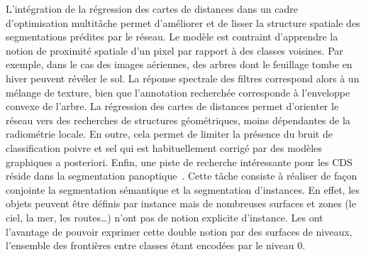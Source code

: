 L'intégration de la régression des cartes de distances dans un cadre d'optimisation multitâche permet d'améliorer et de lisser la structure spatiale des segmentations prédites par le réseau. Le modèle est contraint d'apprendre la notion de proximité spatiale d'un pixel par rapport à des classes voisines. Par exemple, dans le cas des images aériennes, des arbres dont le feuillage tombe en hiver peuvent révéler le sol. La réponse spectrale des filtres correspond alors à un mélange de texture, bien que l'annotation recherchée corresponde à l'enveloppe convexe de l'arbre. La régression des cartes de distances permet d'orienter le réseau vers des recherches de structures géométriques, moins dépendantes de la radiométrie locale. En outre, cela permet de limiter la présence du bruit de classification poivre et sel qui est habituellement corrigé par des modèles graphiques a posteriori.
Enfin, une piste de recherche intéressante pour les \gls{CDS} réside dans la segmentation panoptique~\cite{kirillov_panoptic_2018}. Cette tâche consiste à réaliser de façon conjointe la segmentation sémantique et la segmentation d'instances. En effet, les objets peuvent être définis par instance mais de nombreuses surfaces et zones (le ciel, la mer, les routes\dots) n'ont pas de notion explicite d'instance. Les  ont l'avantage de pouvoir exprimer cette double notion par des surfaces de niveaux, l'ensemble des frontières entre classes étant encodées par le niveau 0.


%
%
\printbibliography[heading=subbibliography]
